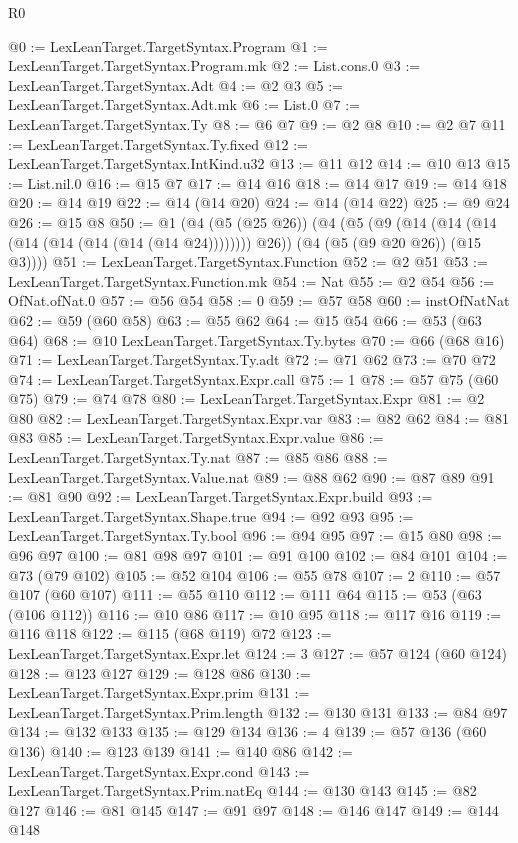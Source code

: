 \begin{lexlean}{R0}
\begin{coremodule}
@0 := LexLeanTarget.TargetSyntax.Program
@1 := LexLeanTarget.TargetSyntax.Program.mk
@2 := List.cons.{0}
@3 := LexLeanTarget.TargetSyntax.Adt
@4 := @2 @3
@5 := LexLeanTarget.TargetSyntax.Adt.mk
@6 := List.{0}
@7 := LexLeanTarget.TargetSyntax.Ty
@8 := @6 @7
@9 := @2 @8
@10 := @2 @7
@11 := LexLeanTarget.TargetSyntax.Ty.fixed
@12 := LexLeanTarget.TargetSyntax.IntKind.u32
@13 := @11 @12
@14 := @10 @13
@15 := List.nil.{0}
@16 := @15 @7
@17 := @14 @16
@18 := @14 @17
@19 := @14 @18
@20 := @14 @19
@22 := @14 (@14 @20)
@24 := @14 (@14 @22)
@25 := @9 @24
@26 := @15 @8
@50 := @1
    (@4
      (@5 (@25 @26))
      (@4
        (@5 (@9 (@14 (@14 (@14 (@14 (@14 (@14 (@14 (@14 @24)))))))) @26))
        (@4 (@5 (@9 @20 @26)) (@15 @3))))
@51 := LexLeanTarget.TargetSyntax.Function
@52 := @2 @51
@53 := LexLeanTarget.TargetSyntax.Function.mk
@54 := Nat
@55 := @2 @54
@56 := OfNat.ofNat.{0}
@57 := @56 @54
@58 := 0
@59 := @57 @58
@60 := instOfNatNat
@62 := @59 (@60 @58)
@63 := @55 @62
@64 := @15 @54
@66 := @53 (@63 @64)
@68 := @10 LexLeanTarget.TargetSyntax.Ty.bytes
@70 := @66 (@68 @16)
@71 := LexLeanTarget.TargetSyntax.Ty.adt
@72 := @71 @62
@73 := @70 @72
@74 := LexLeanTarget.TargetSyntax.Expr.call
@75 := 1
@78 := @57 @75 (@60 @75)
@79 := @74 @78
@80 := LexLeanTarget.TargetSyntax.Expr
@81 := @2 @80
@82 := LexLeanTarget.TargetSyntax.Expr.var
@83 := @82 @62
@84 := @81 @83
@85 := LexLeanTarget.TargetSyntax.Expr.value
@86 := LexLeanTarget.TargetSyntax.Ty.nat
@87 := @85 @86
@88 := LexLeanTarget.TargetSyntax.Value.nat
@89 := @88 @62
@90 := @87 @89
@91 := @81 @90
@92 := LexLeanTarget.TargetSyntax.Expr.build
@93 := LexLeanTarget.TargetSyntax.Shape.true
@94 := @92 @93
@95 := LexLeanTarget.TargetSyntax.Ty.bool
@96 := @94 @95
@97 := @15 @80
@98 := @96 @97
@100 := @81 @98 @97
@101 := @91 @100
@102 := @84 @101
@104 := @73 (@79 @102)
@105 := @52 @104
@106 := @55 @78
@107 := 2
@110 := @57 @107 (@60 @107)
@111 := @55 @110
@112 := @111 @64
@115 := @53 (@63 (@106 @112))
@116 := @10 @86
@117 := @10 @95
@118 := @117 @16
@119 := @116 @118
@122 := @115 (@68 @119) @72
@123 := LexLeanTarget.TargetSyntax.Expr.let
@124 := 3
@127 := @57 @124 (@60 @124)
@128 := @123 @127
@129 := @128 @86
@130 := LexLeanTarget.TargetSyntax.Expr.prim
@131 := LexLeanTarget.TargetSyntax.Prim.length
@132 := @130 @131
@133 := @84 @97
@134 := @132 @133
@135 := @129 @134
@136 := 4
@139 := @57 @136 (@60 @136)
@140 := @123 @139
@141 := @140 @86
@142 := LexLeanTarget.TargetSyntax.Expr.cond
@143 := LexLeanTarget.TargetSyntax.Prim.natEq
@144 := @130 @143
@145 := @82 @127
@146 := @81 @145
@147 := @91 @97
@148 := @146 @147
@149 := @144 @148

\end{coremodule}
\end{lexlean}
